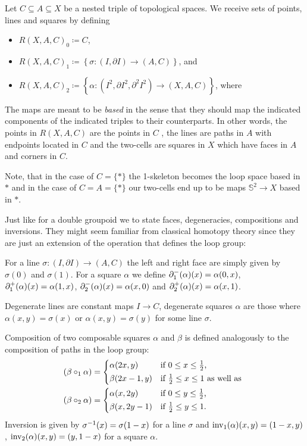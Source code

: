 \begin{defn} \label{def:filtered-maps}
Let $C \subseteq A \subseteq X$ be a nested triple of topological spaces.
We receive sets of points, lines and squares by defining
\begin{itemize}
\item $R(X, A, C)_0 \coloneqq C$,
\item $R(X, A, C)_1 \coloneqq \left\{ \sigma : (I, \partial I) \to (A, C) \right\}$, and
\item $R(X, A, C)_2 \coloneqq \left\{ \alpha : (I^2, \partial I^2, \partial^2 I^2)
	\to (X, A, C) \right\}$, where
\end{itemize}
The maps are meant to be \emph{based} in the sense that they should map the
indicated components of the indicated triples to their counterparts. %
In other words, the points in $R(X, A, C)$ are the points in $C$ , the lines
are paths in $A$ with endpoints located in $C$ and the two-cells are squares
in $X$ which have faces in $A$ and corners in $C$.

Note, that in the case of $C = \{ \ast \}$ the 1-skeleton becomes the loop space
based in $\ast$ and in the case of $C = A = \{ \ast \}$ our two-cells end up to
be maps $\mathbb{S}^2 \to X$ based in $\ast$. %

Just like for a double groupoid we to state faces, degeneracies, compositions
and inversions. They might seem familiar from classical homotopy theory
since they are just an extension of the operation that defines the loop group:

For a line $\sigma : (I, \partial I) \to (A , C)$ the left and right face are
simply given by $\sigma(0)$ and $\sigma(1)$. For a square $\alpha$ we define
$\partial^-_1(\alpha)(x) = \alpha(0,x)$, $\partial^+_1(\alpha)(x) = \alpha(1,x)$,
$\partial^-_2(\alpha)(x) = \alpha(x,0)$ and $\partial^+_2(\alpha)(x) = \alpha(x,1)$.

Degenerate lines are constant maps $I \to C$, degenerate squares $\alpha$ are
those where $\alpha(x,y) = \sigma(x)$ or $\alpha(x,y) = \sigma(y)$ for some
line $\sigma$.

Composition of two composable squares $\alpha$ and $\beta$ is defined analogously
to the composition of paths in the loop group:
\begin{align*}
(\beta \circ_1 \alpha) &= \begin{dcases*}
	\alpha(2x,y) & if $0 \leq x \leq \frac{1}{2}$, \\
	\beta(2x-1,y) & if $\frac{1}{2} \leq x \leq 1$ as well as
	\end{dcases*} \\
(\beta \circ_2 \alpha) &= \begin{dcases*}
	\alpha(x,2y) & if $0 \leq y \leq \frac{1}{2}$, \\
	\beta(x,2y-1) & if $\frac{1}{2} \leq y \leq 1$.
	\end{dcases*}
\end{align*}
Inversion is given by $\sigma^{-1}(x) = \sigma(1-x)$ for a line $\sigma$ and
$\operatorname{inv_1}(\alpha)(x,y) = (1-x,y)$, $\operatorname{inv_2}(\alpha)(x,y) = (y,1-x)$ for a square
$\alpha$.
\end{defn}

